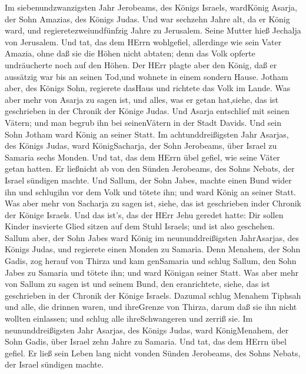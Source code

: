  Im siebenundzwanzigsten Jahr Jerobeams, des Königs Israels,
wardKönig Asarja, der Sohn Amazias, des Königs Judas.  Und
war sechzehn Jahre alt, da er König ward, und regieretezweiundfünfzig
Jahre zu Jerusalem. Seine Mutter hieß Jechalja von Jerusalem.
 Und tat, das dem HErrn wohlgefiel, allerdinge wie sein
Vater Amazia,  ohne daß sie die Höhen nicht abtaten; denn
das Volk opferte undräucherte noch auf den Höhen.  Der HErr
plagte aber den König, daß er aussätzig war bis an seinen Tod,und
wohnete in einem sondern Hause. Jotham aber, des Königs Sohn, regierete
dasHaus und richtete das Volk im Lande.  Was aber mehr von
Asarja zu sagen ist, und alles, was er getan hat,siehe, das ist
geschrieben in der Chronik der Könige Judas.  Und Asarja
entschlief mit seinen Vätern; und man begrub ihn bei seinenVätern in der
Stadt Davids. Und sein Sohn Jotham ward König an seiner Statt.
 Im achtunddreißigsten Jahr Asarjas, des Königs Judas, ward
KönigSacharja, der Sohn Jerobeams, über Israel zu Samaria sechs Monden.
 Und tat, das dem HErrn übel gefiel, wie seine Väter getan
hatten. Er ließnicht ab von den Sünden Jerobeams, des Sohns Nebats, der
Israel sündigen machte.  Und Sallum, der Sohn Jabes, machte
einen Bund wider ihn und schlugihn vor dem Volk und tötete ihn; und ward
König an seiner Statt.  Was aber mehr von Sacharja zu sagen
ist, siehe, das ist geschrieben inder Chronik der Könige Israels.
 Und das ist's, das der HErr Jehu geredet hatte: Dir sollen
Kinder insvierte Glied sitzen auf dem Stuhl Israels; und ist also
geschehen.  Sallum aber, der Sohn Jabes ward König im
neununddreißigsten JahrAsarjas, des Königs Judas, und regierete einen
Monden zu Samaria.  Denn Menahem, der Sohn Gadis, zog
herauf von Thirza und kam genSamaria und schlug Sallum, den Sohn Jabes
zu Samaria und tötete ihn; und ward Königan seiner Statt. 
Was aber mehr von Sallum zu sagen ist und seinem Bund, den eranrichtete,
siehe, das ist geschrieben in der Chronik der Könige Israels.
 Dazumal schlug Menahem Tiphsah und alle, die drinnen
waren, und ihreGrenze von Thirza, darum daß sie ihn nicht wollten
einlassen; und schlug alle ihreSchwangeren und zerriß sie. 
Im neununddreißigsten Jahr Asarjas, des Königs Judas, ward KönigMenahem,
der Sohn Gadis, über Israel zehn Jahre zu Samaria.  Und
tat, das dem HErrn übel gefiel. Er ließ sein Leben lang nicht vonden
Sünden Jerobeams, des Sohns Nebats, der Israel sündigen machte.
